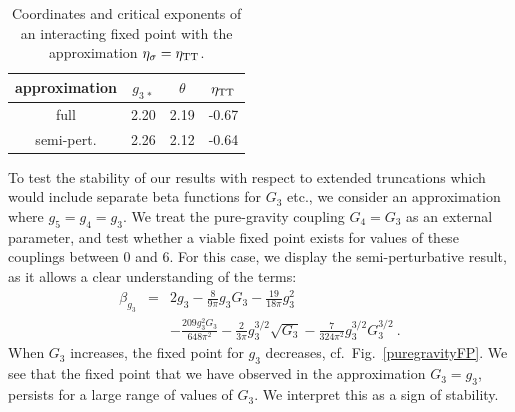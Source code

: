 \documentclass[11pt]{book} %
\newcommand{\bea}{\begin{eqnarray}}
\newcommand{\eea}{\end{eqnarray}}
\begin{document}
\begin{table}[!here]
\begin{tabular}{cccc}
approximation&$g_{3\,\ast}$& $\theta$& $\eta_{\rm TT}$\\ \hline \hline
full & 2.20 & 2.19 & -0.67 \\\hline
semi-pert.&2.26 & 2.12 & -0.64 \\ \hline\hline
\end{tabular}
\caption{\label{puregravityFPetaapprox}Coordinates and critical exponents of an interacting fixed point with the approximation $\eta_{\sigma} = \eta_{\rm TT}$.}
\end{table}

To test the stability of our results with respect to extended truncations which would include separate beta functions for $G_3$ etc., we consider an approximation where $g_5=g_4=g_3$. We treat the pure-gravity coupling $G_4=G_3$ as an external parameter, and test whether a viable fixed point exists for values of these couplings between 0 and 6.
For this case, we display the semi-perturbative result, as it allows a clear understanding of the terms:
\bea
\beta_{g_3} &=&2 g_3 - \frac{8}{9 \pi} g_3 G_3
- \frac{19}{18 \pi}g_3^2
\\
&{}& - \frac{209 g_3^2 G_3}{648 \pi^2}
- \frac{2}{3 \pi}g_3^{3/2}\sqrt{G_3}
- \frac{7}{324 \pi^2}g_3^{3/2}G_3^{3/2}\ .
\nonumber
\eea
When $G_3$ increases, the fixed point for $g_3$ decreases,
cf.~Fig.~\ref{puregravityFP}.
We see that the fixed point that we have observed in the approximation $G_3=g_3$, persists for a large range of values of $G_3$.
We interpret this as a sign of stability.
\end{document}

